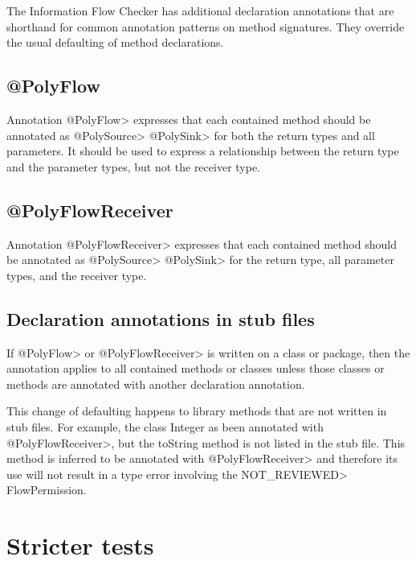 The Information Flow Checker has additional declaration annotations that are shorthand for common 
annotation patterns on method signatures.   They override the usual defaulting of method declarations.

\subsection{@PolyFlow\label{sec:polyflow}}

Annotation \<@PolyFlow> expresses that each contained method should be annotated as \<@PolySource> 
\<@PolySink> for both the return types and all parameters. It should be used to express a relationship 
between the return type and the parameter types, but not the receiver type.


\subsection{@PolyFlowReceiver\label{sec:polyflowreceiver}}

Annotation \<@PolyFlowReceiver> expresses that each contained method should be annotated as \<@PolySource> \<@PolySink> for the return type, all parameter types, and the receiver type.

\subsection{Declaration annotations in stub files\label{sec:declannosstubfiles}}
If \<@PolyFlow> or \<@PolyFlowReceiver> is written on a class or package, then the annotation applies
 to all contained methods or classes unless those classes or methods are annotated with another 
 declaration annotation.   

This change of defaulting happens to library methods that are not written in stub files.  For example, the class
 Integer as been annotated with  \<@PolyFlowReceiver>, but the toString method is not listed in the stub file.  
 This method is inferred to be annotated with  \<@PolyFlowReceiver> and therefore its use will not result in a 
 type error  involving the \<NOT\_REVIEWED> FlowPermission. 
 






\section{Stricter tests\label{sec:stricter}}


